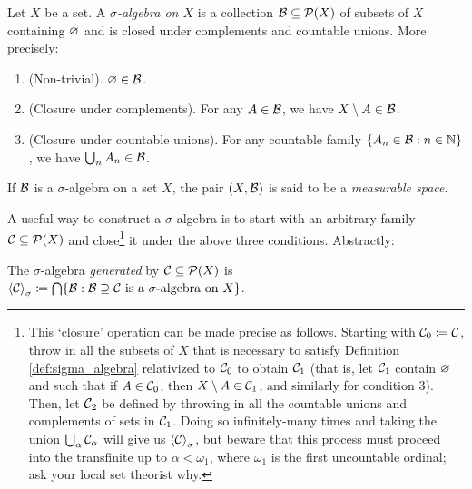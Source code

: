 \documentclass[reqno, twoside]{article}
\begin{document}
    \begin{definition}\label{def:sigma_algebra}
        Let $X$ be a set. A \textit{$\sigma$-algebra on $X$} is a collection $\mathcal{B}\subseteq\mathcal{P}(X)$ of subsets of $X$ containing $\varnothing$ and is closed under complements and countable unions. More precisely:
        \begin{enumerate}
            \item (Non-trivial). $\varnothing\in\mathcal{B}$.
                \vspace{-0.05in}
            \item (Closure under complements). For any $A\in\mathcal{B}$, we have $X\setminus A\in\mathcal{B}$.
                \vspace{-0.05in}
            \item (Closure under countable unions). For any countable family $\left\{A_n\in\mathcal{B}: n\in\mathbb{N}\right\}$, we have $\bigcup_nA_n\in\mathcal{B}$.
        \end{enumerate}
    \end{definition}

    \begin{definition}
        If $\mathcal{B}$ is a $\sigma$-algebra on a set $X$, the pair $(X,\mathcal{B})$ is said to be a \textit{measurable space}.
    \end{definition}

    A useful way to construct a $\sigma$-algebra is to start with an arbitrary family $\mathcal{C}\subseteq\mathcal{P}(X)$ and close\footnote{This `closure' operation can be made precise as follows. Starting with $\mathcal{C}_0\coloneqq\mathcal{C}$, throw in all the subsets of $X$ that is necessary to satisfy Definition \ref{def:sigma_algebra} relativized to $\mathcal{C}_0$ to obtain $\mathcal{C}_1$ (that is, let $\mathcal{C}_1$ contain $\varnothing$ and such that if $A\in\mathcal{C}_0$, then $X\setminus A\in\mathcal{C}_1$, and similarly for condition $3$). Then, let $\mathcal{C}_2$ be defined by throwing in all the countable unions and complements of sets in $\mathcal{C}_1$. Doing so infinitely-many times and taking the union $\bigcup_\alpha\mathcal{C}_\alpha$ will give us $\left\langle\mathcal{C}\right\rangle_\sigma$, but beware that this process must proceed into the transfinite up to $\alpha<\omega_1$, where $\omega_1$ is the first uncountable ordinal; ask your local set theorist why.} it under the above three conditions. Abstractly:
    
    \begin{definition}
        The $\sigma$-algebra \textit{generated} by $\mathcal{C}\subseteq\mathcal{P}(X)$ is $\left\langle\mathcal{C}\right\rangle_\sigma\coloneqq\bigcap\{\mathcal{B}:\mathcal{B}\supseteq\mathcal{C}\textrm{ is a }\sigma\textrm{-algebra on }X\}$.
    \end{definition}
\end{document}
